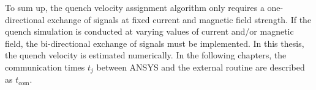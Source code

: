 To sum up, the quench velocity assignment algorithm only requires a one-directional exchange of signals at fixed current and magnetic field strength. If the quench simulation is conducted at varying values of current and/or magnetic field, the bi-directional exchange of signals must be implemented. In this thesis, the quench velocity is estimated numerically. In the following chapters, the communication times $t_j$ between ANSYS and the external routine are described as $t_\text{com}$.

